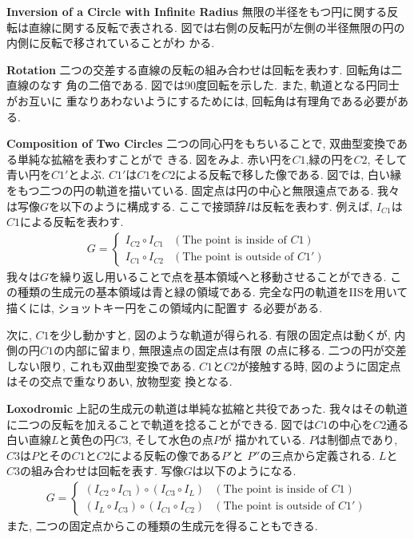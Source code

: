\noindent\textbf{Inversion of a Circle with Infinite Radius}
無限の半径をもつ円に関する反転は直線に関する反転で表される.
図では右側の反転円が左側の半径無限の円の内側に反転で移されていることがわ
かる.

\noindent\textbf{Rotation}
二つの交差する直線の反転の組み合わせは回転を表わす. 回転角は二直線のなす
角の二倍である. 図では90度回転を示した. また, 軌道となる円同士がお互いに
重なりあわないようにするためには, 回転角は有理角である必要がある.

\noindent\textbf{Composition of Two Circles}
二つの同心円をもちいることで, 双曲型変換である単純な拡縮を表わすことがで
きる.
図をみよ.
赤い円を$C1$,緑の円を$C2$, そして青い円を$C1'$とよぶ.
$C1'$は$C1$を$C2$による反転で移した像である.
図では, 白い縁をもつ二つの円の軌道を描いている.
固定点は円の中心と無限遠点である.
我々は写像$G$を以下のように構成する.
ここで接頭辞$I$は反転を表わす.
例えば, $I_{C1}$は$C1$による反転を表わす.
\begin{align*}
 G =
  \begin{cases}
   I_{C2} \circ I_{C1} & (\text{The point is inside of } C1) \\
   I_{C1} \circ I_{C2} & (\text{The point is outside of }C1')
  \end{cases}
\end{align*}
我々は$G$を繰り返し用いることで点を基本領域へと移動させることができる.
この種類の生成元の基本領域は青と緑の領域である.
完全な円の軌道をIISを用いて描くには, ショットキー円をこの領域内に配置す
る必要がある.

次に, $C1$を少し動かすと, 図のような軌道が得られる.
有限の固定点は動くが, 内側の円$C1$の内部に留まり, 無限遠点の固定点は有限
の点に移る.
二つの円が交差しない限り, これも双曲型変換である.
$C1$と$C2$が接触する時, 図のように固定点はその交点で重なりあい, 放物型変
換となる.

\noindent\textbf{Loxodromic}
上記の生成元の軌道は単純な拡縮と共役であった.
我々はその軌道に二つの反転を加えることで軌道を捻ることができる.
図では$C1$の中心を$C2$通る白い直線$L$と黄色の円$C3$, そして水色の点$P$が
描かれている.
$P$は制御点であり, $C3$は$P$とその$C1$と$C2$による反転の像である$P'$と
$P''$の三点から定義される.
$L$と$C3$の組み合わせは回転を表す.
写像$G$は以下のようになる.
\begin{align*}
G =
\begin{cases}
 (I_{C2} \circ I_{C1}) \circ (I_{C3} \circ I_L) & (\text{The point is inside of } C1) \\
 (I_L \circ I_{C3}) \circ (I_{C1} \circ I_{C2}) & (\text{The point is outside of }C1')
\end{cases}
\end{align*}
また, 二つの固定点からこの種類の生成元を得ることもできる.

